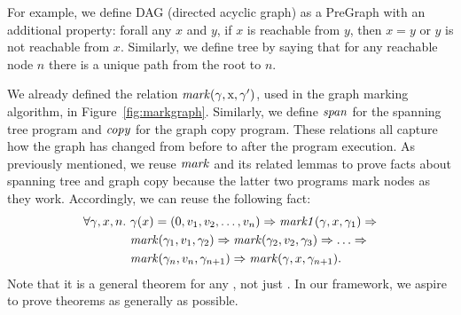 For example, we define DAG (directed acyclic graph) as a PreGraph with
an additional property: forall any $x$ and $y$, if $x$ is reachable
from $y$, then $x = y$ or $y$ is not reachable from $x$.  Similarly, we define tree 
by saying that for any reachable node $n$ there is a unique path from the root
to $n$.

We already defined the relation $\mathit{mark}(\gamma, \text{x}, \gamma')$, used in 
the graph marking algorithm, in Figure~\ref{fig:markgraph}.  
Similarly, we define $\mathit{span}$ for the spanning tree program
and $\mathit{copy}$ for the graph copy program.  These relations all
capture how the graph has changed from before to after the program 
execution.  As previously mentioned, we reuse $\mathit{mark}$ and its
related lemmas to prove facts about spanning tree and graph copy 
because the latter two programs mark nodes as they work. 
Accordingly, we can reuse the following fact:
\begin{equation*}
\begin{split}
\forall \gamma, x, n.~&\gamma(x)=(0, v_1, v_2,\dots,v_n) => \mathit{mark1}(\gamma, x, \gamma_1) =>\\
        & \mathit{mark}(\gamma_1,v_1,\gamma_2) => \mathit{mark}(\gamma_2,v_2,\gamma_3) => \dots =>\\
        & \mathit{mark}(\gamma_n,v_n,\gamma_{n+1}) => \mathit{mark}(\gamma,x,\gamma_{n+1}).
\end{split}
\end{equation*}
Note that it is a general theorem for any , not just
. In our framework, we aspire to prove theorems as generally as possible.

